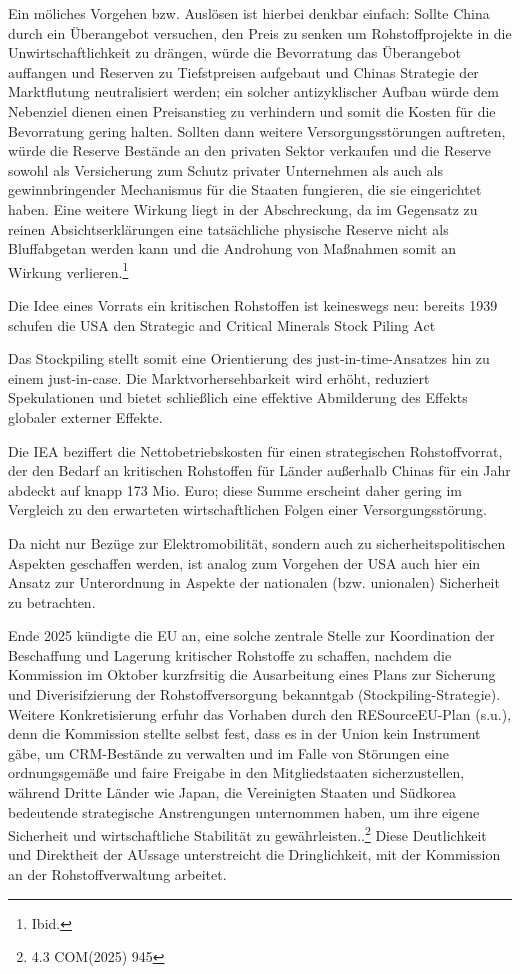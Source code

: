 \documentclass[12pt,a4paper,oneside]{book} %
\begin{document}
Ein möliches Vorgehen bzw. Auslösen ist hierbei denkbar einfach: Sollte China durch ein Überangebot versuchen, den Preis zu senken um Rohstoffprojekte in die Unwirtschaftlichkeit zu drängen, würde die Bevorratung das Überangebot auffangen und Reserven zu Tiefstpreisen aufgebaut und Chinas Strategie der Marktflutung neutralisiert werden; ein solcher antizyklischer Aufbau würde dem Nebenziel dienen einen Preisanstieg zu verhindern und somit die Kosten für die Bevorratung gering halten. Sollten dann weitere Versorgungsstörungen auftreten, würde die Reserve Bestände an den privaten Sektor verkaufen und die Reserve sowohl als Versicherung zum Schutz privater Unternehmen als auch als gewinnbringender Mechanismus für die Staaten fungieren, die sie eingerichtet haben.\autocite{https://ip-quarterly.com/en/case-setting-eu-critical-minerals-stockpile} Eine weitere Wirkung liegt in der Abschreckung, da im Gegensatz zu reinen Absichtserklärungen eine tatsächliche physische Reserve nicht als \glqq Bluff\grqq abgetan werden kann und die Androhung von Maßnahmen somit an Wirkung verlieren.\footnote{Ibid.}

Die Idee eines Vorrats ein kritischen Rohstoffen ist keineswegs neu: bereits 1939 schufen die USA den Strategic and Critical Minerals Stock Piling Act

Das Stockpiling stellt somit eine Orientierung des \glqq just-in-time\grqq-Ansatzes hin zu einem \glqq just-in-case\grqq. Die Marktvorhersehbarkeit wird erhöht, reduziert Spekulationen und bietet schließlich eine effektive Abmilderung des Effekts globaler externer Effekte.

Die IEA beziffert die Nettobetriebskosten für einen strategischen Rohstoffvorrat, der den Bedarf an kritischen Rohstoffen für Länder außerhalb Chinas für ein Jahr abdeckt auf knapp 173 Mio. Euro; diese Summe erscheint daher gering im Vergleich zu den erwarteten wirtschaftlichen Folgen einer Versorgungsstörung.\autocite{IEA Bericht 2026, S. 12}

Da nicht nur Bezüge zur Elektromobilität, sondern auch zu sicherheitspolitischen Aspekten geschaffen werden, ist analog zum Vorgehen der USA auch hier ein Ansatz zur Unterordnung in Aspekte der nationalen (bzw. unionalen) Sicherheit zu betrachten.

Ende 2025 kündigte die EU an, eine solche zentrale Stelle zur Koordination der Beschaffung und Lagerung kritischer Rohstoffe zu schaffen, nachdem die Kommission im Oktober kurzfrsitig die Ausarbeitung eines Plans zur Sicherung und Diverisifzierung der Rohstoffversorgung bekanntgab (Stockpiling-Strategie). Weitere Konkretisierung erfuhr das Vorhaben durch den RESourceEU-Plan (s.u.), denn die Kommission stellte selbst fest, dass es in der Union kein Instrument gäbe, \glqq um CRM-Bestände zu verwalten und im Falle von Störungen eine ordnungsgemäße und faire Freigabe in den Mitgliedstaaten sicherzustellen, während Dritte Länder wie Japan, die Vereinigten Staaten und Südkorea bedeutende strategische Anstrengungen unternommen haben, um ihre eigene Sicherheit und wirtschaftliche Stabilität zu gewährleisten.\grqq.\footnote{4.3 COM(2025) 945} Diese Deutlichkeit und Direktheit der AUssage unterstreicht die Dringlichkeit, mit der Kommission an der Rohstoffverwaltung arbeitet.
\end{document}
